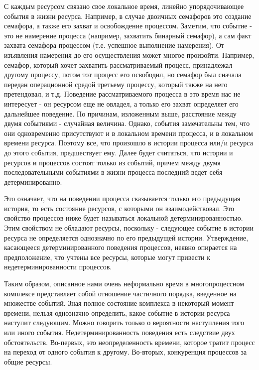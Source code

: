 \begin{multicols}{2}
С каждым ресурсом связано свое локальное время, линейно упорядочивающее события в жизни ресурса. Например, в случае двоичных семафоров это создание семафора, а также его захват и освобождение процессом. Заметим, что событие - это не намерение процесса (например, захватить бинарный семафор), а сам факт захвата семафора процессом (т.е. успешное выполнение намерения). От изъявления намерения до его осуществления может многое произойти. Например, семафор, который хочет захватить рассматриваемый процесс, принадлежал другому процессу, потом тот процесс его освободил, но семафор был сначала передан операционной средой третьему процессу, который также на него претендовал, и т.д. Поведение рассматриваемого процесса в это время нас не интересует - он ресурсом еще не овладел, а только его захват определяет его дальнейшее поведение. По причинам,  изложенным выше, расстояние между двумя событиями - случайная величина. Однако, события замечательны тем, что они одновременно присутствуют и в локальном времени процесса, и в локальном времени ресурса. Поэтому все, что произошло в истории процесса или/и ресурса до этого события, предшествует ему. Далее  будет считаться, что истории и ресурсов и процессов состоят только из событий, причем между двумя последовательными событиями в жизни процесса последний ведет себя детерминированно.

Это означает, что на  поведении процесса сказывается только его предыдущая история, то есть состояние ресурсов, с которыми он взаимодействовал. Это свойство процессов ниже будет называться локальной детерминированностью. Этим свойством не обладают ресурсы, поскольку - следующее событие в истории ресурса не определяется однозначно по его предыдущей истории. Утверждение, касающееся детерминированного поведения процессов, неявно опирается на предположение,  что учтены все ресурсы, которые могут привести к  недетерминированности процессов.

Таким образом, описанное нами очень неформально время в многопроцессном комплексе представляет собой отношение частичного порядка, введенное на множестве событий. Зная полное состояние комплекса в некоторый момент времени,  нельзя однозначно определить, какое событие в истории ресурса наступит следующим. Можно говорить только о вероятности наступления того или иного события. Недетерминированность поведения есть следствие двух обстоятельств. Во-первых, это неопределенность времени, которое тратит процесс на переход от одного события к другому. Во-вторых, конкуренция процессов за общие ресурсы.


\end{multicols}
